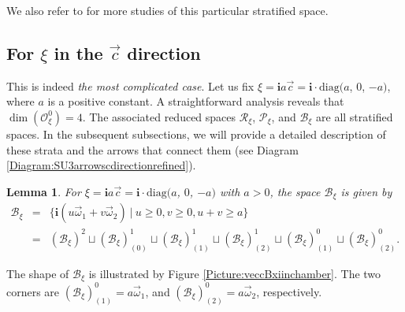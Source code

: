 \documentclass[12pt]{amsart}
\newtheorem{lemma}[theorem]{Lemma}
\theoremstyle{definition}
\numberwithin{equation}{section}
\def\diag{\mathrm{diag}}
\newcommand{\imagunit}{\mathbf{i}}
\newcommand{\Oxi}{\mathcal{O}_{\xi}}
\newcommand{\Reducedxi}{\mathcal{R}_\xi}
\newcommand{\SET}[1]{\{#1\}}
\newcommand{\Pxi}{\mathcal{P}_{\xi}}
\newcommand{\Bxi}{\mathcal{B}_{\xi}}
\begin{document}
{  

 

We also refer to \cite{MGRarxiv2506.16610v2} for  more studies of this particular stratified space. 
 
 
\subsection{For $\xi $   in  the   $\vec{c}$ direction}\label{SubSec:xiinalpha13} 
This is indeed \emph{the most complicated case}. Let us fix $\xi =\imagunit a\vec{c}=\imagunit\cdot \diag(a $, $0$, $-a  )$, where $a$ is a positive constant. A straightforward analysis reveals that $\dim(\Oxi^0) = 4$.  
The associated reduced spaces $\Reducedxi  $, $\Pxi $, and $\Bxi $ are all stratified spaces.  
In the subsequent subsections, we will provide a detailed description of these strata and the arrows that connect them (see Diagram \ref{Diagram:SU3arrowscdirectionrefined}).
 
 
  
 
\begin{lemma}\label{Lemma:veccBxishape} For   $\xi =\imagunit a\vec{c}=\imagunit\cdot \diag(a $, $0$, $-a  )$ with $a>0$, the space $\Bxi$ is given by
\begin{eqnarray}\label{Eqt:veccBxi2uvuplusv}
\Bxi  &=& \SET{\imagunit ( u\vec{\omega}_1+v\vec{\omega}_2)~|~ u\geqslant 0 ,v\geqslant 0 ,u+v\geqslant a}
\\\nonumber 
&=&  (\Bxi)^2    \sqcup (\Bxi)^1_{(0)}  \sqcup (\Bxi)^1_{(1)}  \sqcup (\Bxi)^1_{(2)}  \sqcup
(\Bxi)^0_{(1)}  \sqcup(\Bxi)^0_{(2)}  .
\end{eqnarray}

\end{lemma}
The shape of $\Bxi $ is illustrated by Figure \ref{Picture:veccBxiinchamber}. The two corners are $(\Bxi)^0_{(1)}  =a\vec{\omega}_1$, and $(\Bxi)^0_{(2)}  =a\vec{\omega}_2$, respectively.

}
\end{document}

